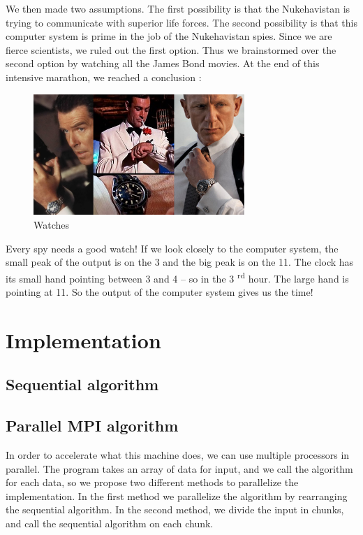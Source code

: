 \documentclass[11pt,a4paper]{article}
\begin{document}
We then made two assumptions. The first possibility is that the Nukehavistan is trying to communicate with superior life forces. The second possibility is that this computer system is prime in the job of the Nukehavistan spies. Since we are fierce scientists, we ruled out the first option. Thus we brainstormed over the second option by watching all the James Bond movies. At the end of this intensive marathon, we reached a conclusion :

\begin{figure}[!h]
\centering
\includegraphics[width=8cm]{watches.png}
\caption{Watches}
\label{reverse}
\end{figure}

Every spy needs a good watch! If we look closely to the computer system, the small peak of the output is on the 3 and the big peak is on the 11. The clock has its small hand pointing between 3 and 4 -- so in the 3 \textsuperscript{rd} hour. The large hand is pointing at 11. So the output of the computer system gives us the time!

\section{Implementation}

\subsection{Sequential algorithm}

\subsection{Parallel MPI algorithm}

In order to accelerate what this machine does, we can use multiple processors in parallel. The program takes an array of data for input, and we call the algorithm for each data, so we propose two different methods to parallelize the implementation. In the first method we parallelize the algorithm by rearranging the sequential algorithm. In the second method, we divide the input in chunks, and call the sequential algorithm on each chunk.
\end{document}
